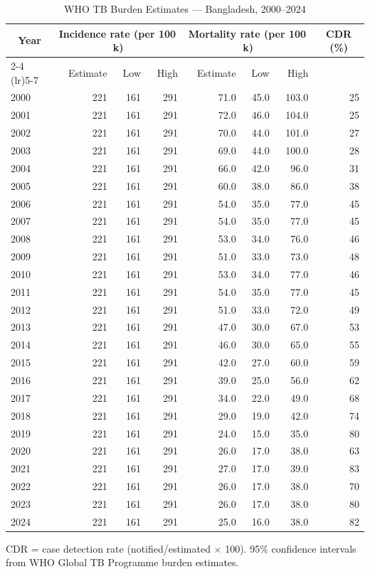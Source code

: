 \begin{table}[htbp]
\centering
\caption{WHO TB Burden Estimates — Bangladesh, 2000--2024}
\label{tab:burden}
\small
\begin{tabular}{lrrrrrrr}
\toprule
\multicolumn{1}{c}{\textbf{Year}} &\multicolumn{3}{c}{\textbf{Incidence rate (per 100\,k)}} &\multicolumn{3}{c}{\textbf{Mortality rate (per 100\,k)}} &\multicolumn{1}{c}{\textbf{CDR (\%)}} \\
\cmidrule(lr){2-4} \cmidrule(lr){5-7}
& Estimate & Low & High & Estimate & Low & High & \\
\midrule
2000 & 221 & 161 & 291 & 71.0 & 45.0 & 103.0 & 25 \\
2001 & 221 & 161 & 291 & 72.0 & 46.0 & 104.0 & 25 \\
2002 & 221 & 161 & 291 & 70.0 & 44.0 & 101.0 & 27 \\
2003 & 221 & 161 & 291 & 69.0 & 44.0 & 100.0 & 28 \\
2004 & 221 & 161 & 291 & 66.0 & 42.0 & 96.0 & 31 \\
2005 & 221 & 161 & 291 & 60.0 & 38.0 & 86.0 & 38 \\
2006 & 221 & 161 & 291 & 54.0 & 35.0 & 77.0 & 45 \\
2007 & 221 & 161 & 291 & 54.0 & 35.0 & 77.0 & 45 \\
2008 & 221 & 161 & 291 & 53.0 & 34.0 & 76.0 & 46 \\
2009 & 221 & 161 & 291 & 51.0 & 33.0 & 73.0 & 48 \\
2010 & 221 & 161 & 291 & 53.0 & 34.0 & 77.0 & 46 \\
2011 & 221 & 161 & 291 & 54.0 & 35.0 & 77.0 & 45 \\
2012 & 221 & 161 & 291 & 51.0 & 33.0 & 72.0 & 49 \\
2013 & 221 & 161 & 291 & 47.0 & 30.0 & 67.0 & 53 \\
2014 & 221 & 161 & 291 & 46.0 & 30.0 & 65.0 & 55 \\
2015 & 221 & 161 & 291 & 42.0 & 27.0 & 60.0 & 59 \\
2016 & 221 & 161 & 291 & 39.0 & 25.0 & 56.0 & 62 \\
2017 & 221 & 161 & 291 & 34.0 & 22.0 & 49.0 & 68 \\
2018 & 221 & 161 & 291 & 29.0 & 19.0 & 42.0 & 74 \\
2019 & 221 & 161 & 291 & 24.0 & 15.0 & 35.0 & 80 \\
2020 & 221 & 161 & 291 & 26.0 & 17.0 & 38.0 & 63 \\
2021 & 221 & 161 & 291 & 27.0 & 17.0 & 39.0 & 83 \\
2022 & 221 & 161 & 291 & 26.0 & 17.0 & 38.0 & 70 \\
2023 & 221 & 161 & 291 & 26.0 & 17.0 & 38.0 & 80 \\
2024 & 221 & 161 & 291 & 25.0 & 16.0 & 38.0 & 82 \\
\bottomrule
\end{tabular}
\par\smallskip
\raggedright\footnotesize CDR = case detection rate (notified/estimated $\times$ 100). 95\% confidence intervals from WHO Global TB Programme burden estimates.
\end{table}